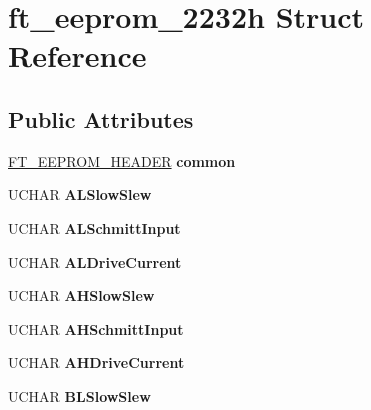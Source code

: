 \hypertarget{structft__eeprom__2232h}{}\section{ft\+\_\+eeprom\+\_\+2232h Struct Reference}
\label{structft__eeprom__2232h}
\subsection*{Public Attributes}
\begin{DoxyCompactItemize}
\item 
\hyperlink{structft__eeprom__header}{F\+T\+\_\+\+E\+E\+P\+R\+O\+M\+\_\+\+H\+E\+A\+D\+ER} {\bfseries common}\hypertarget{structft__eeprom__2232h_a9b818fef5106306f0fb8456979164d4e}{}\label{structft__eeprom__2232h_a9b818fef5106306f0fb8456979164d4e}

\item 
U\+C\+H\+AR {\bfseries A\+L\+Slow\+Slew}\hypertarget{structft__eeprom__2232h_a202255f5052272a7807e17fd5d580438}{}\label{structft__eeprom__2232h_a202255f5052272a7807e17fd5d580438}

\item 
U\+C\+H\+AR {\bfseries A\+L\+Schmitt\+Input}\hypertarget{structft__eeprom__2232h_aabf6af90bb51868803bb93b09f45d6fd}{}\label{structft__eeprom__2232h_aabf6af90bb51868803bb93b09f45d6fd}

\item 
U\+C\+H\+AR {\bfseries A\+L\+Drive\+Current}\hypertarget{structft__eeprom__2232h_add083043190baacddfb71891e65f0e35}{}\label{structft__eeprom__2232h_add083043190baacddfb71891e65f0e35}

\item 
U\+C\+H\+AR {\bfseries A\+H\+Slow\+Slew}\hypertarget{structft__eeprom__2232h_acfcd2fc032788785109a3f6cf48541a9}{}\label{structft__eeprom__2232h_acfcd2fc032788785109a3f6cf48541a9}

\item 
U\+C\+H\+AR {\bfseries A\+H\+Schmitt\+Input}\hypertarget{structft__eeprom__2232h_abeb4cedf9e0a7ff67cba78e20d1c9c53}{}\label{structft__eeprom__2232h_abeb4cedf9e0a7ff67cba78e20d1c9c53}

\item 
U\+C\+H\+AR {\bfseries A\+H\+Drive\+Current}\hypertarget{structft__eeprom__2232h_a66a0e83f79b8ab08e2b7ae6dad6a6ab9}{}\label{structft__eeprom__2232h_a66a0e83f79b8ab08e2b7ae6dad6a6ab9}

\item 
U\+C\+H\+AR {\bfseries B\+L\+Slow\+Slew}\hypertarget{structft__eeprom__2232h_ac04377c073041676bf56e25152572952}{}\label{structft__eeprom__2232h_ac04377c073041676bf56e25152572952}


\end{DoxyCompactItemize}
